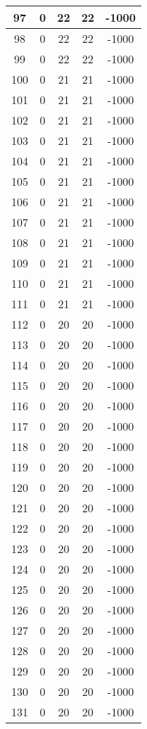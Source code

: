 \documentclass[letterpaper, 12pt]{article}
\begin{document}
\begin{longtable}{|c|c|c|c|c|}
\hline
97 & 0 & 22 & 22 & -1000 \\
\hline
98 & 0 & 22 & 22 & -1000 \\
\hline
99 & 0 & 22 & 22 & -1000 \\
\hline
100 & 0 & 21 & 21 & -1000 \\
\hline
101 & 0 & 21 & 21 & -1000 \\
\hline
102 & 0 & 21 & 21 & -1000 \\
\hline
103 & 0 & 21 & 21 & -1000 \\
\hline
104 & 0 & 21 & 21 & -1000 \\
\hline
105 & 0 & 21 & 21 & -1000 \\
\hline
106 & 0 & 21 & 21 & -1000 \\
\hline
107 & 0 & 21 & 21 & -1000 \\
\hline
108 & 0 & 21 & 21 & -1000 \\
\hline
109 & 0 & 21 & 21 & -1000 \\
\hline
110 & 0 & 21 & 21 & -1000 \\
\hline
111 & 0 & 21 & 21 & -1000 \\
\hline
112 & 0 & 20 & 20 & -1000 \\
\hline
113 & 0 & 20 & 20 & -1000 \\
\hline
114 & 0 & 20 & 20 & -1000 \\
\hline
115 & 0 & 20 & 20 & -1000 \\
\hline
116 & 0 & 20 & 20 & -1000 \\
\hline
117 & 0 & 20 & 20 & -1000 \\
\hline
118 & 0 & 20 & 20 & -1000 \\
\hline
119 & 0 & 20 & 20 & -1000 \\
\hline
120 & 0 & 20 & 20 & -1000 \\
\hline
121 & 0 & 20 & 20 & -1000 \\
\hline
122 & 0 & 20 & 20 & -1000 \\
\hline
123 & 0 & 20 & 20 & -1000 \\
\hline
124 & 0 & 20 & 20 & -1000 \\
\hline
125 & 0 & 20 & 20 & -1000 \\
\hline
126 & 0 & 20 & 20 & -1000 \\
\hline
127 & 0 & 20 & 20 & -1000 \\
\hline
128 & 0 & 20 & 20 & -1000 \\
\hline
129 & 0 & 20 & 20 & -1000 \\
\hline
130 & 0 & 20 & 20 & -1000 \\
\hline
131 & 0 & 20 & 20 & -1000 \\

\end{longtable}
\end{document}
